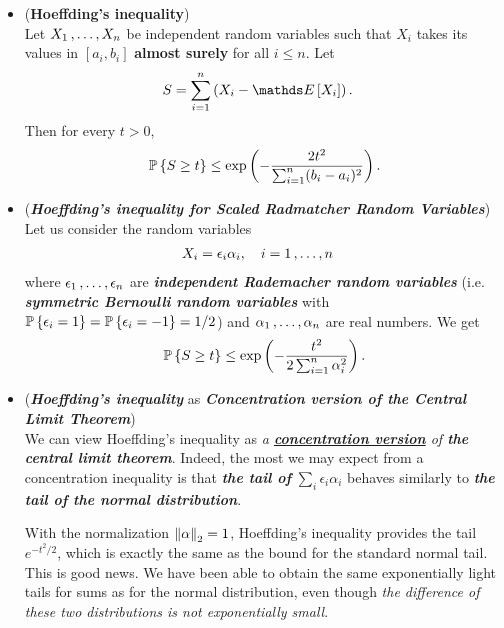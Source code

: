 \documentclass[11pt]{article}
\begin{document}
\begin{itemize}
\item \begin{proposition} (\textbf{Hoeffding's inequality}) \citep{boucheron2013concentration} \\
Let $X_1 \,{,}\ldots{,}\, X_n$ be independent random variables such that $X_i$ takes its values in $[a_i, b_i]$ \textbf{almost surely} for all $i \le n$. Let
\begin{align*}
S &= \sum_{i=1}^{n}\paren{X_i - \E{}{X_i}}.
\end{align*}
Then for every $t > 0$,
\begin{align}
{\mathbb P}\left\{S \ge  t\right\} \le \exp\left(- \frac{2t^2}{\sum_{i=1}^{n}(b_i - a_i)^2}\right). \label{ineqn: hoeffding_inequality}
\end{align}
\end{proposition}

\item \begin{remark}  (\textbf{\emph{Hoeffding's inequality for Scaled Radmatcher Random Variables}}) \\
Let us consider the random variables 
\begin{align*}
X_i &= \epsilon_i \alpha_i, \quad i=1 \,{,}\ldots{,}\, n 
\end{align*} where $\epsilon_1 \,{,}\ldots{,}\, \epsilon_n$ are \emph{\textbf{independent Rademacher random variables}} (i.e. \emph{\textbf{symmetric Bernoulli random variables}} with ${\mathbb P}\left\{\epsilon_i = 1\right\} = {\mathbb P}\left\{\epsilon_i = -1\right\} = 1/2$) and $\alpha_1 \,{,}\ldots{,}\, \alpha_n$ are real numbers.  We get
\begin{align*}
{\mathbb P}\left\{S \ge  t\right\} \le \exp\left(- \frac{t^2}{2\sum_{i=1}^{n}\alpha_i^2}\right).
\end{align*}
\end{remark}

\item \begin{remark} (\emph{\textbf{Hoeffding's inequality}} as \textbf{\emph{Concentration version of the Central Limit Theorem}}) \citep{vershynin2018high} \\
We can view Hoeffding's inequality as \emph{a \underline{\textbf{concentration version}} of \textbf{the central limit theorem}}. Indeed, the most we may expect from a concentration inequality is that \emph{\textbf{the tail of}} $\sum_{i}\epsilon_i \alpha_i$ behaves similarly to \emph{\textbf{the tail of the normal distribution}}. 

With the normalization $\left\|\alpha\right\|_{2} = 1$, Hoeffding’s inequality provides the tail $e^{-t^2/2}$, which is exactly the same as the bound for the standard normal tail. This is good news. We have been able to obtain the same exponentially light tails for sums as for the normal distribution, even though \emph{the difference of these two distributions is not exponentially small}.
\end{remark}


\end{itemize}
\end{document}
